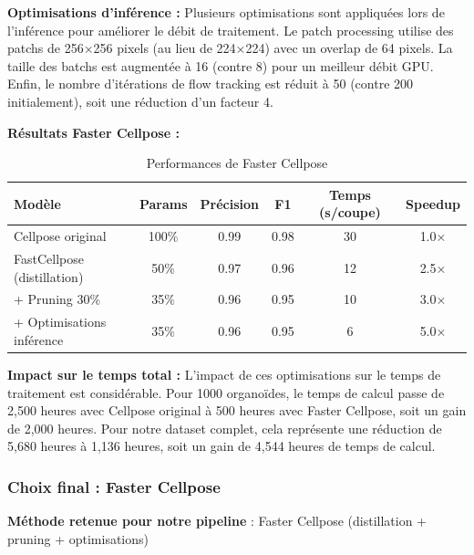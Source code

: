 \textbf{Optimisations d'inférence :}
Plusieurs optimisations sont appliquées lors de l'inférence pour améliorer le débit de traitement. Le patch processing utilise des patchs de 256×256 pixels (au lieu de 224×224) avec un overlap de 64 pixels. La taille des batchs est augmentée à 16 (contre 8) pour un meilleur débit GPU. Enfin, le nombre d'itérations de flow tracking est réduit à 50 (contre 200 initialement), soit une réduction d'un facteur 4.

\textbf{Résultats Faster Cellpose :}
\begin{table}[h]
\centering
\caption{Performances de Faster Cellpose}
\begin{tabular}{lccccc}
\toprule
\textbf{Modèle} & \textbf{Params} & \textbf{Précision} & \textbf{F1} & \textbf{Temps (s/coupe)} & \textbf{Speedup} \\
\midrule
Cellpose original & 100\% & 0.99 & 0.98 & 30 & 1.0× \\
FastCellpose (distillation) & 50\% & 0.97 & 0.96 & 12 & 2.5× \\
+ Pruning 30\% & 35\% & 0.96 & 0.95 & 10 & 3.0× \\
+ Optimisations inférence & 35\% & 0.96 & 0.95 & 6 & 5.0× \\
\bottomrule
\end{tabular}
\end{table}

\textbf{Impact sur le temps total :}
L'impact de ces optimisations sur le temps de traitement est considérable. Pour 1000 organoïdes, le temps de calcul passe de 2,500 heures avec Cellpose original à 500 heures avec Faster Cellpose, soit un gain de 2,000 heures. Pour notre dataset complet, cela représente une réduction de 5,680 heures à 1,136 heures, soit un gain de 4,544 heures de temps de calcul.

\subsubsection{Choix final : Faster Cellpose}

\textbf{Méthode retenue pour notre pipeline} : Faster Cellpose (distillation + pruning + optimisations)

